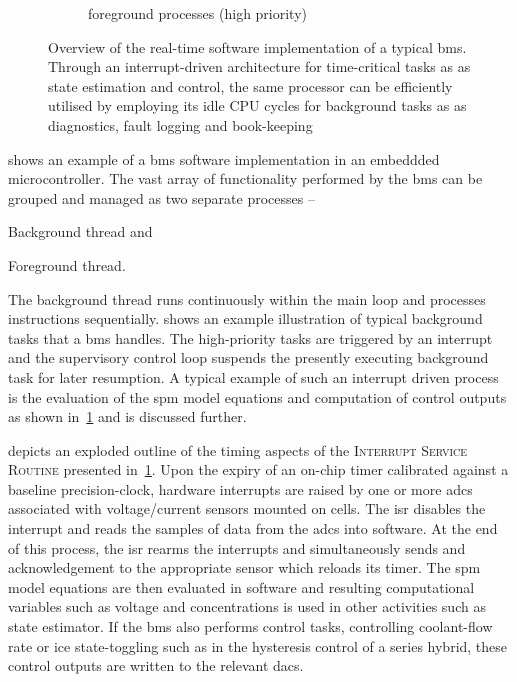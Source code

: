 \begin{figure}[htb]
{\begin{subfigure}[b]{0.48\textwidth}
        \end{subfigure}
        \hfill
        \begin{subfigure}[b]{0.48\textwidth}
            \raisebox{\dimexpr.5\ht\algboxA-.5\ht\algboxB}{%
                \usebox{\algboxB}%
            }
            \caption{foreground processes (high priority)}
            \label{subfig:fgRTprocess}
        \end{subfigure}
    }
    \caption[Overview of the real-time software implementation of a typical
    \gls{bms}]{Overview of the real-time software implementation of a typical
        \gls{bms}. Through an interrupt-driven architecture for time-critical tasks as
        as state estimation and control, the same processor can be
        efficiently utilised by employing its idle CPU cycles for background tasks as
    as diagnostics, fault logging and book-keeping}
    \label{fig:basicRTCsoftwarearch}
\end{figure}

  shows  an  example   of  a  \gls{bms}  software
implementation in an embeddded microcontroller. The vast array of functionality
performed by the \gls{bms} can be grouped and managed as two separate processes --
\begin{enumerate*}[label=\itshape\alph*\upshape)]
    \item Background thread and
    \item Foreground thread.
\end{enumerate*}
The   background   thread  runs   continuously   within   the  main   loop   and
processes instructions sequentially.   shows an example
illustration  of  typical  background  tasks   that  a  \gls{bms}  handles.  The
high-priority tasks  are triggered by  an interrupt and the  supervisory control
loop suspends  the presently executing  background task for later  resumption. A
typical  example of  such  an  interrupt driven  process  is  the evaluation  of
the  \gls{spm} model  equations  and  computation of  control  outputs as  shown
in~\cref{subfig:fgRTprocess} and is discussed further.

 depicts an exploded outline of the timing aspects of
the \textsc{Interrupt  Service Routine}  presented in~\cref{subfig:fgRTprocess}.
Upon   the  expiry   of  an   on-chip  timer   calibrated  against   a  baseline
precision-clock,  hardware  interrupts are  raised  by  one or  more  \gls{adc}s
associated with voltage/current sensors mounted on cells. The \gls{isr} disables
the  interrupt  and  reads  the  samples   of  data  from  the  \gls{adc}s  into
software. At  the end of this  process, the \gls{isr} rearms  the interrupts and
simultaneously sends and acknowledgement to the appropriate sensor which reloads
its timer.  The \gls{spm}  model equations  are then  evaluated in  software and
resulting computational variables such as  voltage and concentrations is used in
other activities  such as state estimator.  If the \gls{bms} also performs  control
tasks, \eg{} controlling coolant-flow rate or \gls{ice} state-toggling
such as in the hysteresis control of a series hybrid, these control outputs are written
to the relevant \gls{dac}s.

